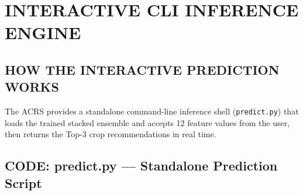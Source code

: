 \documentclass[12pt,a4paper,oneside]{report}
\begin{document}
\chapter{INTERACTIVE CLI INFERENCE ENGINE}

\section{HOW THE INTERACTIVE PREDICTION WORKS}

The ACRS provides a standalone command-line inference shell (\texttt{predict.py}) that loads the trained stacked ensemble and accepts 12 feature values from the user, then returns the Top-3 crop recommendations in real time.

\section{CODE: predict.py --- Standalone Prediction Script}
\end{document}
